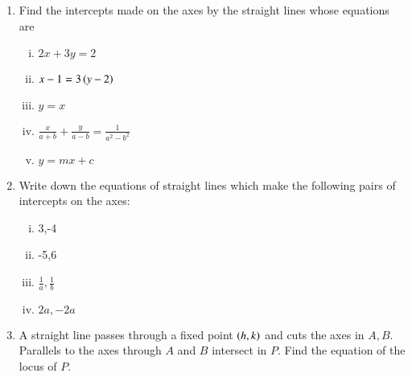 \begin{enumerate}[1.]
\item Find the intercepts made on the axes by the straight lines whose equations are
\begin{multicols}{2}
\begin{enumerate}[(i)]
\item
$
2x+3y = 2
$
\item
$
x-1 = 3\left(y-2\right)
$ 
\item
$
y = x
$
\item
$
\frac{x}{a+b} + \frac{y}{a-b} = \frac{1}{a^2-b^2}
$
\item 
$
y = mx+c
$
\end{enumerate}
\end{multicols}
\item Write down the equations of straight lines which make the following pairs of intercepts on the axes:
\begin{multicols}{2}
\begin{enumerate}[(i)]
\item 3,-4
\item -5,6
\item 
$
\frac{1}{a},\frac{1}{b}
$
\item 
$
2a,-2a
$
\end{enumerate}
\end{multicols}
\item A straight line passes through a fixed point $\left(h,k\right)$ and cuts the axes in $A,B$.  Parallels to the
axes through $A$ and $B$ intersect in $P$.  Find the equation of the locus of $P$.
\end{enumerate}
